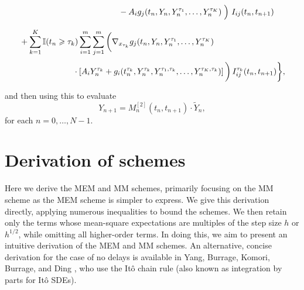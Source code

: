 \documentclass[onefignum]{siamart250211}
\begin{document}
\begin{definition}
\begin{align}
&\phantom{+\sum_{i=1}^m\sum_{j=1}^m\quad}\hspace{2.5cm}-A_ig_j(t_n,Y_n,Y_n^{\tau_1},\ldots,Y_n^{\tau_K})\left.\vphantom{\sum}\right)\,I_{ij}(t_n,t_{n+1})\nonumber\\
&+\sum_{k=1}^K\mathbb{I}(t_n\geqslant\tau_k)\sum_{i=1}^m\sum_{j=1}^m\bigg(\nabla_{x_{\tau_k}}g_j(t_n,Y_n,Y_n^{\tau_1},\ldots,Y_n^{\tau_K})\nonumber\\
&\phantom{+\sum_{k=1}^K\mathbb{I}(t_n\geqslant\tau_k)}\!\!\cdot\left[A_iY_n^{\tau_k}+g_i(t_n^{\tau_k},Y_n^{\tau_k},Y_n^{\tau_1,\tau_k},\ldots,Y_n^{\tau_K,\tau_k})\right]\bigg)\,I_{ij}^{\tau_k}(t_n,t_{n+1})\bigg\},\nonumber
\end{align}
and then using this to evaluate
\begin{equation}
Y_{n+1}=M_n^{[2]}(t_n,t_{n+1})\cdot\tilde{Y}_n,\label{SDDEMM}
\end{equation}
for each $n=0,\ldots,N-1$.
\end{definition}


\section{Derivation of schemes}\label{Section3}

Here we derive the MEM and MM schemes, primarily focusing on the MM scheme as the MEM scheme is simpler to express. We give this derivation directly, applying numerous inequalities to bound the schemes. We then retain only the terms whose mean-square expectations are multiples of the step size $h$ or $h^{1/2}$, while omitting all higher-order terms. In doing this, we aim to present an intuitive derivation of the MEM and MM schemes. An alternative, concise derivation for the case of no delays is available in Yang, Burrage, Komori, Burrage, and Ding \cite{BurrageBurrage2021}, who use the It\^o chain rule (also known as integration by parts for It\^o SDEs).
\end{document}
